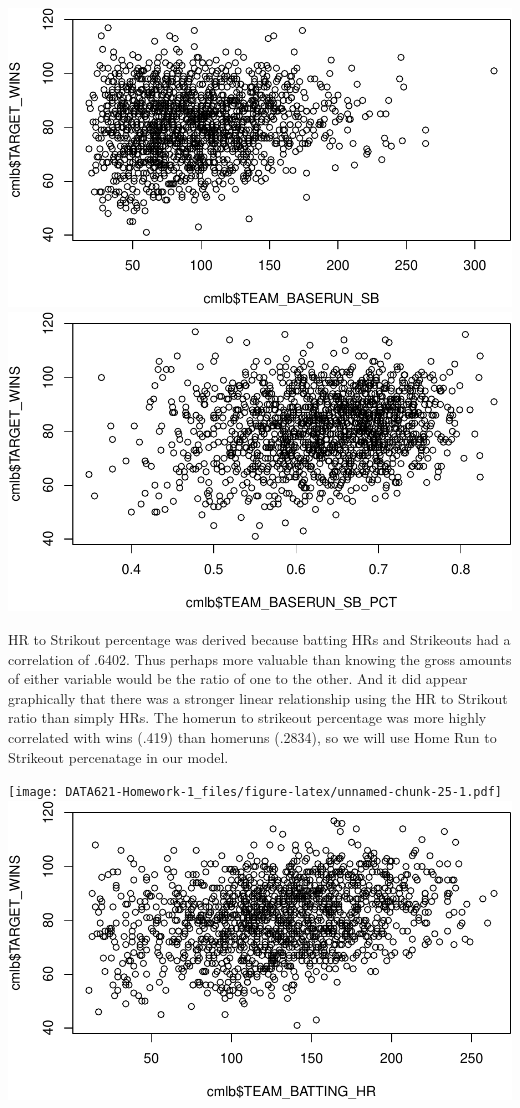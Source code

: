 \documentclass[]{article}
\begin{document}
\includegraphics{DATA621-Homework-1_files/figure-latex/unnamed-chunk-24-1.pdf}
\includegraphics{DATA621-Homework-1_files/figure-latex/unnamed-chunk-24-2.pdf}

HR to Strikout percentage was derived because batting HRs and Strikeouts
had a correlation of .6402. Thus perhaps more valuable than knowing the
gross amounts of either variable would be the ratio of one to the other.
And it did appear graphically that there was a stronger linear
relationship using the HR to Strikout ratio than simply HRs. The homerun
to strikeout percentage was more highly correlated with wins (.419) than
homeruns (.2834), so we will use Home Run to Strikeout percenatage in
our model.

\texttt{[image: DATA621-Homework-1\_files/figure-latex/unnamed-chunk-25-1.pdf]}
\includegraphics{DATA621-Homework-1_files/figure-latex/unnamed-chunk-25-2.pdf}
\end{document}
